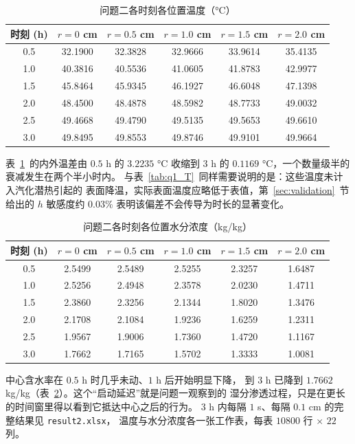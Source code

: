\begin{table}[H]
  \centering
  \caption{问题二各时刻各位置温度（°C）}
  \label{tab:q2_T}
  \begin{tabular}{cccccc}
  \toprule
  时刻 (h) & $r=0$ cm & $r=0.5$ cm & $r=1.0$ cm & $r=1.5$ cm & $r=2.0$ cm \\
  \midrule
  0.5 & 32.1900 & 32.3828 & 32.9666 & 33.9614 & 35.4135 \\
  1.0 & 40.3816 & 40.5536 & 41.0605 & 41.8783 & 42.9977 \\
  1.5 & 45.8464 & 45.9345 & 46.1927 & 46.6048 & 47.1398 \\
  2.0 & 48.4500 & 48.4878 & 48.5982 & 48.7733 & 49.0032 \\
  2.5 & 49.4668 & 49.4790 & 49.5135 & 49.5653 & 49.6610 \\
  3.0 & 49.8495 & 49.8553 & 49.8746 & 49.9101 & 49.9664 \\
  \bottomrule
  \end{tabular}
\end{table}

表~\ref{tab:q2_T}~的内外温差由 $0.5$ h 的 $3.2235$ °C 收缩到 $3$ h 的
$0.1169$ °C，一个数量级半的衰减发生在两个半小时内。
与表~\ref{tab:q1_T}~同样需要说明的是：这些温度未计入汽化潜热引起的
表面降温，实际表面温度应略低于表值，第~\ref{sec:validation}~节给出的
$h$ 敏感度约 $0.03\%$ 表明该偏差不会传导为时长的显著变化。

\begin{table}[H]
  \centering
  \caption{问题二各时刻各位置水分浓度（kg/kg）}
  \label{tab:q2_C}
  \begin{tabular}{cccccc}
  \toprule
  时刻 (h) & $r=0$ cm & $r=0.5$ cm & $r=1.0$ cm & $r=1.5$ cm & $r=2.0$ cm \\
  \midrule
  0.5 & 2.5499 & 2.5489 & 2.5255 & 2.3257 & 1.6487 \\
  1.0 & 2.5256 & 2.4948 & 2.3578 & 2.0230 & 1.4711 \\
  1.5 & 2.3860 & 2.3256 & 2.1344 & 1.8020 & 1.3476 \\
  2.0 & 2.1708 & 2.1084 & 1.9236 & 1.6259 & 1.2311 \\
  2.5 & 1.9567 & 1.9006 & 1.7360 & 1.4720 & 1.1167 \\
  3.0 & 1.7662 & 1.7165 & 1.5702 & 1.3333 & 1.0081 \\
  \bottomrule
  \end{tabular}
\end{table}

中心含水率在 $0.5$ h 时几乎未动、$1$ h 后开始明显下降，
到 $3$ h 已降到 $1.7662$ kg/kg（表~\ref{tab:q2_C}）。这个“启动延迟”就是问题一观察到的
湿分渗透过程，只是在更长的时间窗里得以看到它抵达中心之后的行为。
$3$ h 内每隔 $1$ s、每隔 $0.1$ cm 的完整结果见 \verb|result2.xlsx|，
温度与水分浓度各一张工作表，每表 $10800$ 行 $\times$ $22$ 列。

